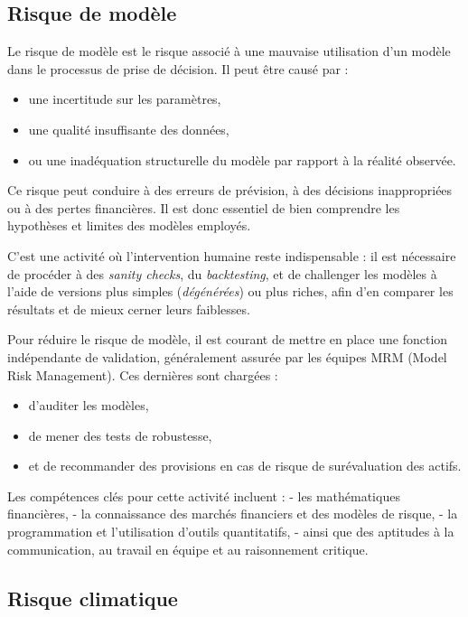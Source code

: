 \documentclass[
  letterpaper,
  DIV=11,
  numbers=noendperiod]{scrartcl}
\providecommand{\tightlist}{%
  \setlength{\itemsep}{0pt}\setlength{\parskip}{0pt}}\usepackage{longtable,booktabs,array}
\begin{document}
\subsection{Risque de modèle}\label{risque-de-moduxe8le}

Le risque de modèle est le risque associé à une mauvaise utilisation
d'un modèle dans le processus de prise de décision. Il peut être causé
par :

\begin{itemize}
\tightlist
\item
  une incertitude sur les paramètres,
\item
  une qualité insuffisante des données,
\item
  ou une inadéquation structurelle du modèle par rapport à la réalité
  observée.
\end{itemize}

Ce risque peut conduire à des erreurs de prévision, à des décisions
inappropriées ou à des pertes financières. Il est donc essentiel de bien
comprendre les hypothèses et limites des modèles employés.

C'est une activité où l'intervention humaine reste indispensable : il
est nécessaire de procéder à des \emph{sanity checks}, du
\emph{backtesting}, et de challenger les modèles à l'aide de versions
plus simples (\emph{dégénérées}) ou plus riches, afin d'en comparer les
résultats et de mieux cerner leurs faiblesses.

Pour réduire le risque de modèle, il est courant de mettre en place une
fonction indépendante de validation, généralement assurée par les
équipes MRM (Model Risk Management). Ces dernières sont chargées :

\begin{itemize}
\tightlist
\item
  d'auditer les modèles,
\item
  de mener des tests de robustesse,
\item
  et de recommander des provisions en cas de risque de surévaluation des
  actifs.
\end{itemize}

Les compétences clés pour cette activité incluent : - les mathématiques
financières, - la connaissance des marchés financiers et des modèles de
risque, - la programmation et l'utilisation d'outils quantitatifs, -
ainsi que des aptitudes à la communication, au travail en équipe et au
raisonnement critique.

\subsection{Risque climatique}\label{risque-climatique}
\end{document}
